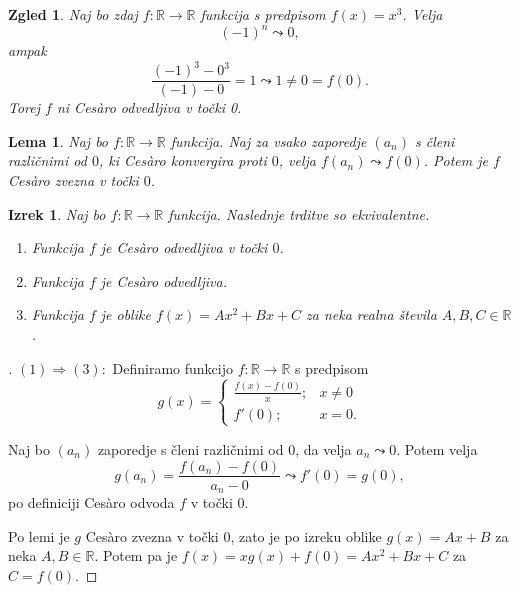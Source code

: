 \documentclass[10]{beamer}
\newtheorem{izrek}{Izrek}
\newtheorem{lema}{Lema}
\newtheorem{zgled}{Zgled}
\newenvironment{dokaz}{\begin{proof}[\bfseries\upshape\proofname]}{\end{proof}}
\begin{document}
\begin{frame}
    \begin{zgled}
        Naj bo zdaj $f: \mathbb{R} \rightarrow \mathbb{R}$ funkcija s predpisom $f(x) = x^3$. Velja 
        $$(-1)^n \leadsto 0,$$ 
        ampak 
        $$\frac{(-1)^3-0^3}{(-1)-0} = 1 \leadsto 1 \neq 0 = f(0).$$ 
        Torej $f$ ni Ces\`{a}ro odvedljiva v točki 0.
    \end{zgled}
\end{frame}

\begin{frame}
    \begin{lema}
        \label{lema}
        Naj bo $f: \mathbb{R} \rightarrow \mathbb{R}$ funkcija. Naj za vsako zaporedje $(a_n)$ s členi različnimi od $0$, ki Ces\`{a}ro konvergira proti $0$, velja $f(a_n) \leadsto f(0)$. Potem je $f$ Ces\`{a}ro zvezna v točki $0$.
    \end{lema}
\end{frame}

\begin{frame}
    \begin{izrek}
        \label{klasodv}
        Naj bo $f: \mathbb{R} \rightarrow \mathbb{R}$ funkcija. Naslednje trditve so ekvivalentne.
        \begin{enumerate}
            \item Funkcija $f$ je Ces\`{a}ro odvedljiva v točki $0$.
            \item Funkcija $f$ je Ces\`{a}ro odvedljiva.
            \item Funkcija $f$ je oblike $f(x) = Ax^2 + Bx + C$ za neka realna števila $A, B, C \in \mathbb{R}$.
        \end{enumerate}
    \end{izrek}
\end{frame}

\begin{frame}
    \begin{dokaz}\renewcommand{\qedsymbol}{}
        $(1) \Rightarrow (3): $ Definiramo funkcijo $f: \mathbb{R} \rightarrow \mathbb{R}$ s predpisom 
        $$
        g(x) = \begin{cases}
            \frac{f(x)-f(0)}{x}; & x \neq 0\\
            f'(0); & x = 0.
        \end{cases}
        $$
        \pause

        Naj bo $(a_n)$ zaporedje s členi različnimi od $0$, da velja $a_n \leadsto 0$. Potem velja 
        $$g(a_n) = \frac{f(a_n)-f(0)}{a_n-0} \leadsto f'(0) = g(0),$$
        po definiciji Ces\`{a}ro odvoda $f$ v točki $0$. 
        \pause
        
        Po lemi je $g$ Ces\`{a}ro zvezna v točki $0$, zato je po izreku oblike $g(x) = Ax + B$ za neka $A, B \in \mathbb{R}$. Potem pa je 
        $f(x) = xg(x) + f(0) = Ax^2 + Bx + C$ za $C = f(0)$.
    \end{dokaz}
\end{frame}
\end{document}
